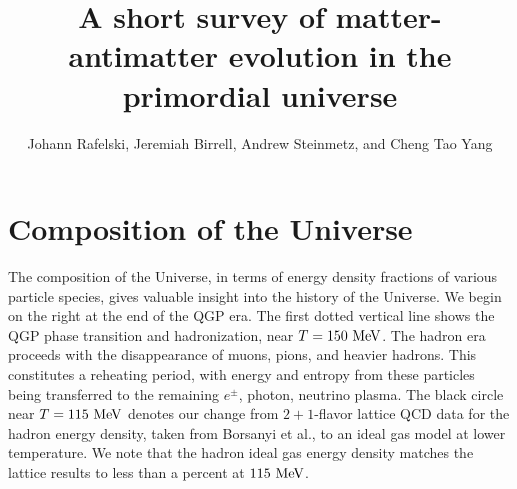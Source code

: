\documentclass{article}
\title{\boldmath A short survey of matter-antimatter evolution in the primordial universe}
\author{Johann Rafelski\orc{\orcA}, Jeremiah Birrell\orc{\orcD}, Andrew Steinmetz\orc{\orcC}, and Cheng Tao Yang\orc{\orcB}}
\begin{document}
\maketitle

 



\section{Composition of the Universe}\label{sec:E_dens}
The composition of the Universe, in terms of energy density fractions of various particle species, gives valuable insight into the history of the Universe. We begin on the right at the end  of the QGP era.  The first dotted vertical line shows the QGP phase transition and hadronization, near $T=150\text{ MeV}$. The hadron era proceeds with the disappearance of muons, pions, and heavier hadrons.  This constitutes a reheating period, with energy and entropy from these particles being transferred to the remaining $e^\pm$, photon, neutrino plasma.   The black circle near $T=115\text{ MeV}$ denotes our change from $2+1$-flavor lattice QCD data for the hadron energy density, taken from Borsanyi et al., to an ideal gas model at lower temperature.  We note that the hadron ideal gas energy density matches the lattice results to less than a percent at $115\text{ MeV}$.~\cite{Ruffini:2009hg}



\end{document}
